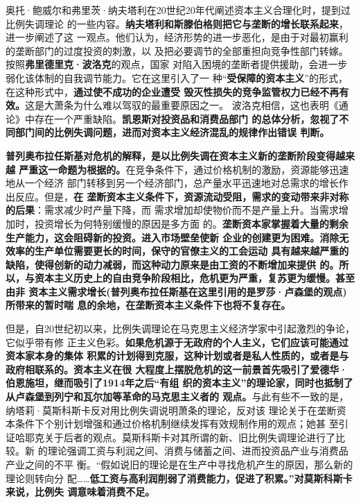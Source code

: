 奥托·鲍威尔和弗里茨·纳夫塔利在20世纪20年代阐述资本主义合理化时，提到过比例失调理论
的一些内容。\textbf{纳夫塔利和斯滕伯格则把它与垄断的增长联系起来}，进一步阐述了这
一观点。他们认为，经济形势的进一步恶化，是由于对最初赢利的垄断部门的过度投资的刺激，以
及把必要调节的全部重担向竞争性部门转嫁。按照\textbf{弗里德里克·波洛克}的观点，国家
对陷入困境的垄断者提供援助，会进一步弱化该体制的自我调节能力。它在这里引入了一
种“\textbf{受保障的资本主义}”的形式，在这种形式中，\textbf{通过使不成功的企业遭受
毁灭性损失的竞争监管权力已经不再有效。}这是大萧条为什么难以驾驭的最重要原因之一。
波洛克相信，这也表明《通论》中存在一个严重缺陷。\textbf{凯恩斯对投资品和消费品部门
的总体分析，忽视了不同部门间的比例失调问题，进而对资本主义经济混乱的规律作出错误
判断。}

\textbf{普列奥布拉任斯基对危机的解释，是以比例失调在资本主义新的垄断阶段变得越来越
严重这一命题为根据的。}在竞争条件下，通过价格机制的激励，资源能够迅速地从一个经济
部门转移到另一个经济部门，总产量水平迅速地对总需求的增长作出反应。但是，\textbf{在
垄断资本主义条件下，资源流动受阻，需求的变动带来非对称的后果}：需求减少时产量下降，而
需求增加却使物价而不是产量上升。当需求增加时，投资增长为何特别缓慢的原因是多方面
的。\textbf{垄断资本家掌握着大量的剩余生产能力，这会阻碍新的投资。进入市场壁垒使新
企业的创建更为困难。消除无效率的生产单位需要更长的时间，保守的官僚主义的工会运动
具有越来越严重的缺陷，使得创新的动力减弱，而这种动力原来是由工资的不断增加来提供
的。所以，与资本主义历史上的自由竞争阶段相比，危机更为严重，复苏更为缓慢。甚至由非
资本主义需求增长(普列奥布拉任斯基在这里引用的是罗莎·卢森堡的观点)所带来的暂时喘
息的余地，在垄断资本主义条件下也将不复存在。}

但是，自20世纪初以来，比例失调理论在马克思主义经济学家中引起激烈的争论，它似乎带有修
正主义色彩。\textbf{如果危机源于无政府的个人主义，它们应该可能通过资本家本身的集体
积累的计划得到克服，这种计划或者是私人性质的，或者是与政府相联系的。资本主义在很
大程度上摆脱危机的这一前景首先吸引了爱德华·伯恩施坦，继而吸引了1914年之后“有组
织的资本主义”的理论家，同时也抵制了从卢森堡到列宁和瓦尔加等革命的马克思主义者的
观点。}与此有些不一致的是，纳塔莉·莫斯科斯卡反对用比例失调说明萧条的理论，反对该
理论关于在垄断资本条件下个别计划增强和通过价格机制继续发挥有效规制作用的观点；她甚
至引证哈耶克关于后者的观点。莫斯科斯卡对其所谓的新、旧比例失调理论进行了比较。新
的理论强调工资与利润之间、消费与储蓄之间、进而投资品产业与消费品产业之间的不平
衡。“假如说旧的理论是在生产中寻找危机产生的原因，那么新的理论则转向分
配……\textbf{低工资与高利润削弱了消费能力，促进了积累。”对莫斯科斯卡来说，比例失
调意味着消费不足。}


